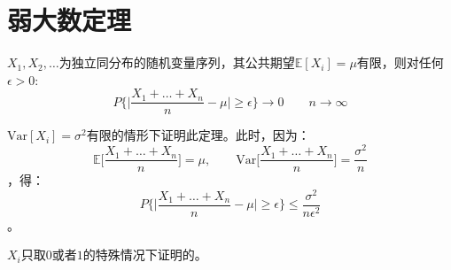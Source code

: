 \documentclass[UTF8]{article}
\begin{document}
\section{弱大数定理}
\(X_{1},X_{2},\ldots \)为独立同分布的随机变量序列，其公共期望\(\mathbb{E}[X_{i}] = \mu\)有限，则对任何\(\epsilon > 0\):
\begin{equation}
\label{eq:13}
P\bigg\{ \bigg| \frac{X_{1}+ \ldots + X_{n}}{n} - \mu \bigg| \geq \epsilon \bigg\} \to 0 \qquad n\to \infty
\end{equation}
\begin{shaded}
	\(\mathrm{Var}[X_{i}] = \sigma^{2}\)有限的情形下证明此定理。此时，因为：
	\begin{equation}
	\label{eq:14}
	\mathbb{E}\bigg[\frac{X_{1} +\ldots +X_{n}}{n}\bigg] = \mu, \qquad  \mathrm{Var}\bigg[ \frac{X_{1} +\ldots +X_{n}}{n} \bigg] = \frac{\sigma^{2}}{n}
	\end{equation}
	，得： 
	\begin{equation}
	\label{eq:15}
	P\bigg\{ \bigg| \frac{X_{1}+ \ldots + X_{n}}{n} - \mu \bigg| \geq \epsilon \bigg\} \leq \frac{\sigma^{2}}{n\epsilon^{2}}
	\end{equation}
	。
\end{shaded}
\(X_{i}\)只取\(0\)或者\(1\)的特殊情况下证明的。
\end{document}
